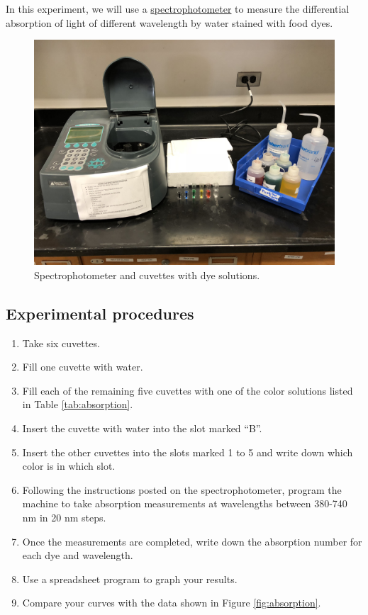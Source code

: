 In this experiment, we will use a
\href{https://en.wikipedia.org/wiki/Spectrophotometry}{spectrophotometer}
to measure the differential absorption of light of different wavelength
by water stained with food dyes.

\begin{figure}

{\centering \includegraphics[width=0.7\linewidth]{./figures/photosynthesis/spectrophotometer}

}

\caption{Spectrophotometer and cuvettes with dye solutions.}\label{fig:spectrophotometer}
\end{figure}

\subsection{Experimental procedures}\label{experimental-procedures-23}

\begin{enumerate}
\def\labelenumi{\arabic{enumi}.}
\tightlist
\item
  Take six cuvettes.
\item
  Fill one cuvette with water.
\item
  Fill each of the remaining five cuvettes with one of the color
  solutions listed in Table \ref{tab:absorption}.
\item
  Insert the cuvette with water into the slot marked ``B''.
\item
  Insert the other cuvettes into the slots marked 1 to 5 and write down
  which color is in which slot.
\item
  Following the instructions posted on the spectrophotometer, program
  the machine to take absorption measurements at wavelengths between
  380-740 nm in 20 nm steps.
\item
  Once the measurements are completed, write down the absorption number
  for each dye and wavelength.
\item
  Use a spreadsheet program to graph your results.
\item
  Compare your curves with the data shown in Figure
   \ref{fig:absorption}.
\end{enumerate}


